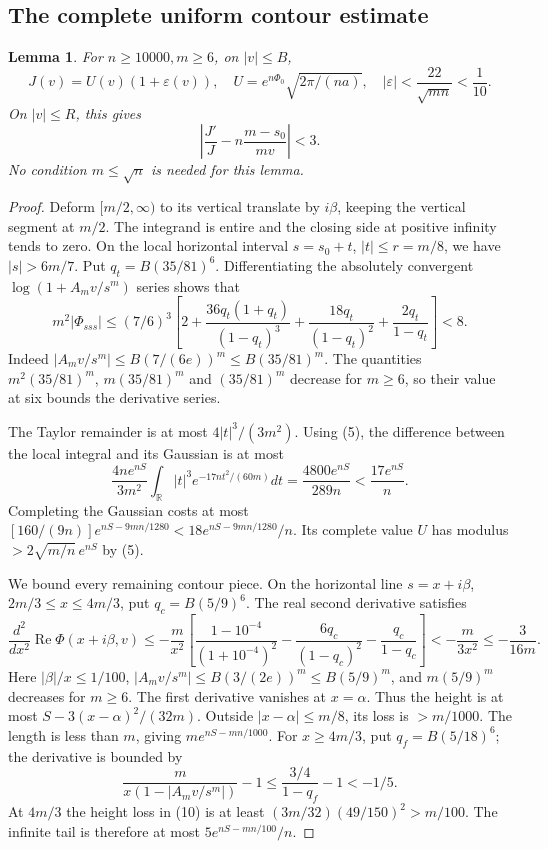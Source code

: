 \documentclass[11pt]{article}
\newtheorem{lemma}[theorem]{Lemma}
\begin{document}
\subsection{The complete uniform contour estimate}
\begin{lemma}\label{lem:J}
For $n\ge10000,m\ge6$, on $|v|\le B$,
\[
 J(v)=U(v)(1+\varepsilon(v)),\quad
 U=e^{n\Phi_0}\sqrt{2\pi/(na)},\quad
 |\varepsilon|<\frac{22}{\sqrt{mn}}<\frac1{10}.         \tag{7}
\]
On $|v|\le R$, this gives
\[
 \left|\frac{J'}J-n\frac{m-s_0}{mv}\right|<3.          \tag{8}
\]
No condition $m\le\sqrt n$ is needed for this lemma.
\end{lemma}
\begin{proof}
Deform $[m/2,\infty)$ to its vertical translate by $i\beta$, keeping the
vertical segment at $m/2$. The integrand is entire and the closing side
at positive infinity tends to zero. On the local horizontal interval
$s=s_0+t$, $|t|\le r=m/8$, we have $|s|>6m/7$.
Put $q_t=B(35/81)^6$. Differentiating the absolutely convergent
$\log(1+A_mv/s^m)$ series shows that
\[
 m^2|\Phi_{sss}|
 \le(7/6)^3\left[2+
 \frac{36q_t(1+q_t)}{(1-q_t)^3}
 +\frac{18q_t}{(1-q_t)^2}+\frac{2q_t}{1-q_t}\right]<8. \tag{9}
\]
Indeed $|A_mv/s^m|\le B(7/(6e))^m\le B(35/81)^m$.
The quantities $m^2(35/81)^m$, $m(35/81)^m$ and $(35/81)^m$
decrease for $m\ge6$, so their value at six bounds the derivative series.

The Taylor remainder is at most $4|t|^3/(3m^2)$.
Using (5), the difference between the local integral and its Gaussian is
at most
\[
 \frac{4ne^{nS}}{3m^2}\int_{\mathbb R}|t|^3
 e^{-17nt^2/(60m)}dt
 =\frac{4800e^{nS}}{289n}<\frac{17e^{nS}}n.
\]
Completing the Gaussian costs at most
$[160/(9n)]e^{nS-9mn/1280}<18e^{nS-9mn/1280}/n$.
Its complete value $U$ has modulus $>2\sqrt{m/n}\,e^{nS}$ by (5).

We bound every remaining contour piece. On the horizontal line
$s=x+i\beta$, $2m/3\le x\le4m/3$, put $q_c=B(5/9)^6$.
The real second derivative satisfies
\[
 \frac{d^2}{dx^2}\operatorname{Re}\Phi(x+i\beta,v)
 \le-\frac m{x^2}\left[
 \frac{1-10^{-4}}{(1+10^{-4})^2}
 -\frac{6q_c}{(1-q_c)^2}-\frac{q_c}{1-q_c}\right]
 <-\frac m{3x^2}\le-\frac3{16m}.                      \tag{10}
\]
Here $|\beta|/x\le1/100$,
$|A_mv/s^m|\le B(3/(2e))^m\le B(5/9)^m$, and
$m(5/9)^m$ decreases for $m\ge6$.
The first derivative vanishes at $x=\alpha$. Thus the height is at most
$S-3(x-\alpha)^2/(32m)$. Outside $|x-\alpha|\le m/8$, its loss is
$>m/1000$. The length is less than $m$, giving
$m e^{nS-mn/1000}$.
For $x\ge4m/3$, put $q_f=B(5/18)^6$; the derivative is bounded by
\[
 \frac{m}{x(1-|A_mv/s^m|)}-1
 \le\frac{3/4}{1-q_f}-1<-1/5.
\]
At $4m/3$ the height loss in (10) is at least
$(3m/32)(49/150)^2>m/100$. The infinite tail is therefore at most
$5e^{nS-mn/100}/n$.


\end{proof}
\end{document}
